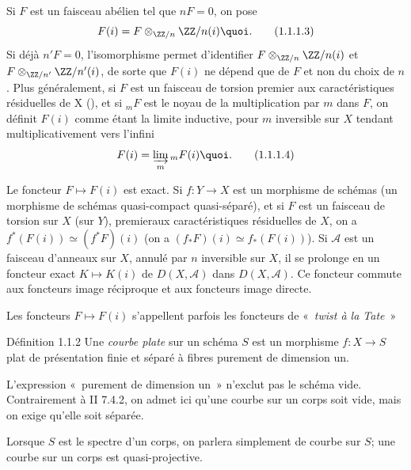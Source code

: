 Si $F$ est un faisceau abélien tel que $nF=0$, on pose
\begin{equation*}
F(i)=F\otimes_{\ZZ/n}\ZZ/n(i){\quoi}.\tag{1.1.1.3}
\end{equation*}%
Si déjà $n'F=0$, l'isomorphisme  permet d'identifier
$F\otimes_{\ZZ/n}\ZZ/n(i)$ et
${F\otimes_{\ZZ/n'}\ZZ/n'(i)}$, de sorte que
$F(i)$ ne dépend que de $F$ et non du choix de $n$. Plus généralement,
si $F$ est un faisceau de torsion premier aux caractéristiques
résiduelles de X (), et si ${}_{m}F$ est le noyau de la
multiplication par $m$ dans $F$, on définit $F(i)$ comme étant la
limite inductive, pour $m$ inversible sur $X$ tendant
multiplicativement vers l'infini
\begin{equation*}
F(i)=\varinjlim_{m}{}_{m}F(i){\quoi}.\tag{1.1.1.4}
\end{equation*}

Le foncteur $F\mapsto F(i)$  est exact. Si $f:Y\rightarrow X$ est un
morphisme de schémas (\resp un morphisme de schémas quasi-compact
quasi-séparé), et si $F$ est un faisceau de torsion sur $X$ (\resp sur
$Y$), premier\pageoriginale aux caractéristiques résiduelles de $X$,
on a $f^{\ast}(F(i))\simeq(f^{\ast}F)(i)$ (\resp on a
$(f_{\ast}F)(i)\simeq f_{\ast}(F(i))$). Si $\mathcal{A}$ est un faisceau
d'anneaux sur $X$, annulé par $n$ inversible sur $X$, il se prolonge
en un foncteur exact $K\mapsto K(i)$ de $D(X,\mathcal{A})$ dans
$D(X,\mathcal{A})$. Ce foncteur commute aux foncteurs image réciproque
et aux foncteurs image directe.

Les foncteurs $F\mapsto F(i)$ s'appellent parfois les foncteurs de « \emph{twist à la Tate} »

\begin{enonce*}{Définition 1.1.2}
Une \emph{courbe plate} sur un schéma $S$ est un morphisme
$f:X\rightarrow S$ plat de présentation finie et séparé à fibres
purement de dimension un.
\end{enonce*}

L'expression « purement de dimension un »  n'exclut pas le schéma
vide. Contrairement à \EGA II 7.4.2, on admet ici qu'une courbe sur un
corps soit vide, mais on exige qu'elle soit séparée.

Lorsque $S$ est le spectre d'un corps, on parlera simplement de courbe
sur $S$; une courbe sur un corps est quasi-projective.

